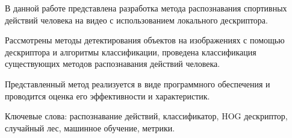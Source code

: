 \setcounter{page}{5}
\begin{essay}{}
В данной работе представлена разработка метода распознавания спортивных действий человека на видео с использованием локального дескриптора.

Рассмотрены методы детектирования объектов на изображениях с помощью дескриптора и алгоритмы классификации, проведена классификация существующих методов распознавания действий человека. 

Представленный метод реализуется в виде программного обеспечения
и проводится оценка его эффективности и характеристик.

Ключевые слова: распознавание действий, классификатор, HOG дескриптор, случайный лес, машинное обучение, метрики.

	
\end{essay}
